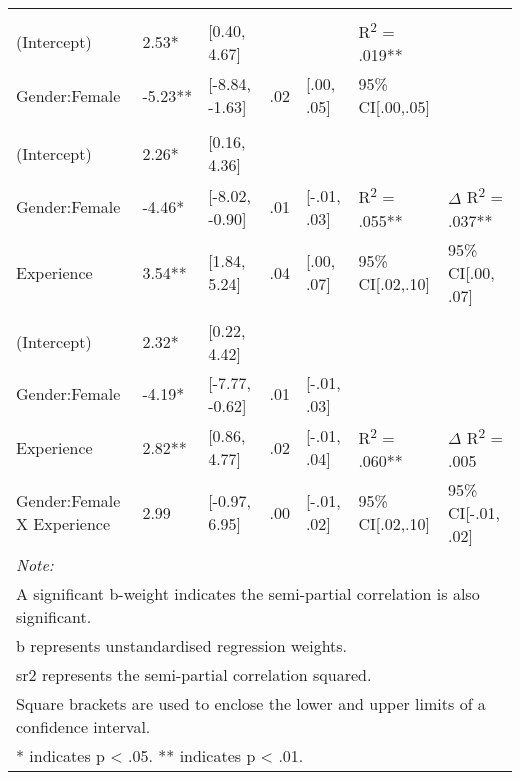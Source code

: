 \documentclass[
  12pt,
  a4paper,
]{book}
\begin{document}
\begin{landscape}
\begin{table}
\begin{tabular}[t]{lllllll}
\addlinespace[0.3em]
\hline
\multicolumn{7}{l}{\textbf{Emergency}}\\
\hline
\addlinespace[0.3em]
\multicolumn{7}{l}{\textit{\textbf{Step 1}}}\\
\hspace{1em}(Intercept) & 2.53* & [0.40, 4.67] &  &  & R\textsuperscript{2} = .019** & \\
\hspace{1em}Gender:Female & -5.23** & [-8.84, -1.63] & .02 & [.00, .05] & 95\% CI[.00,.05] & \\
\addlinespace[0.3em]
\multicolumn{7}{l}{\textit{\textbf{Step 2}}}\\
\hspace{1em}(Intercept) & 2.26* & [0.16, 4.36] &  &  &  & \\
\hspace{1em}Gender:Female & -4.46* & [-8.02, -0.90] & .01 & [-.01, .03] & R\textsuperscript{2} = .055** & $\Delta$ R\textsuperscript{2} = .037**\\
\hspace{1em}Experience & 3.54** & [1.84, 5.24] & .04 & [.00, .07] & 95\% CI[.02,.10] & 95\% CI[.00, .07]\\
\addlinespace[0.3em]
\multicolumn{7}{l}{\textit{\textbf{Step 3}}}\\
\hspace{1em}(Intercept) & 2.32* & [0.22, 4.42] &  &  &  & \\
\hspace{1em}Gender:Female & -4.19* & [-7.77, -0.62] & .01 & [-.01, .03] &  & \\
\hspace{1em}Experience & 2.82** & [0.86, 4.77] & .02 & [-.01, .04] & R\textsuperscript{2} = .060** & $\Delta$ R\textsuperscript{2} = .005\\
\hspace{1em}Gender:Female X Experience & 2.99 & [-0.97, 6.95] & .00 & [-.01, .02] & 95\% CI[.02,.10] & 95\% CI[-.01, .02]\\
\bottomrule
\multicolumn{7}{l}{\textit{Note: }}\\
\multicolumn{7}{l}{A significant b-weight indicates the semi-partial correlation is also significant.}\\
\multicolumn{7}{l}{b represents unstandardised regression weights.}\\
\multicolumn{7}{l}{sr2 represents the semi-partial correlation squared.}\\
\multicolumn{7}{l}{Square brackets are used to enclose the lower and upper limits of a confidence interval.}\\
\multicolumn{7}{l}{* indicates p < .05. ** indicates p < .01.}\\
\end{tabular}
\end{table}
\end{landscape}
\end{document}
